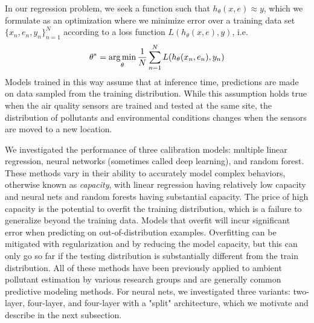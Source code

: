 \documentclass[journal abbreviation, manuscript]{copernicus}
\begin{document}
In our regression problem, we seek a function such that $h_\theta(x, e) \approx y$, which we formulate as an optimization where we minimize error over a training data set $\{x_n, e_n, y_n\}_{n = 1}^N$ according to a loss function $L(h_\theta(x, e), y)$, i.e. 
\begin{equation}
\theta^* = \operatorname*{arg\,min}_\theta \frac{1}{N}\sum_{n = 1}^N L(h_\theta(x_n, e_n), y_n)
\end{equation}
Models trained in this way assume that at inference time, predictions are made on data sampled from the training distribution. While this assumption holds true when the air quality sensors are trained and tested at the same site, the distribution of pollutants and environmental conditions changes when the sensors are moved to a new location. 

We investigated the performance of three calibration models: multiple linear regression, neural networks (sometimes called deep learning), and random forest.  These methods vary in their ability to accurately model complex behaviors, otherwise known as \textit{capacity}, with linear regression having relatively low capacity and neural nets and random forests having substantial capacity.  The price of high capacity is the potential to overfit the training distribution, which is a failure to generalize beyond the training data. Models that overfit will incur significant error when predicting on out-of-distribution examples. Overfitting can be mitigated with regularization and by reducing the model capacity, but this can only go so far if the testing distribution is substantially different from the train distribution. All of these methods have been previously applied to ambient pollutant estimation by various research groups \citep{Piedrahita2014,Spinelle2015,SPINELLE2017706,Sadighi2018,Zimmerman2018,Casey2018testing} and are generally common predictive modeling methods.  For neural nets, we investigated three variants: two-layer, four-layer, and four-layer with a "split" architecture, which we motivate and describe in the next subsection.

\end{document}
